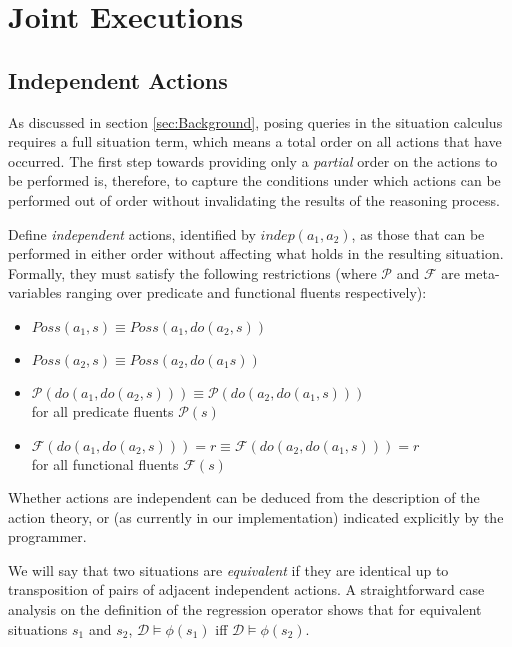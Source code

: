 \section{Joint Executions}

\label{sec:Joint-Execs}


\subsection{Independent Actions}

As discussed in section \ref{sec:Background}, posing queries in the
situation calculus requires a full situation term, which means a total
order on all actions that have occurred. The first step towards providing
only a \emph{partial} order on the actions to be performed is, therefore,
to capture the conditions under which actions can be performed out
of order without invalidating the results of the reasoning process.

Define \emph{independent} actions, identified by $indep(a_{1},a_{2})$,
as those that can be performed in either order without affecting what
holds in the resulting situation. Formally, they must satisfy the
following restrictions (where $\mathcal{P}$ and $\mathcal{F}$ are
meta-variables ranging over predicate and functional fluents respectively):

\begin{itemize}
\item $Poss(a_{1},s)\equiv Poss(a_{1},do(a_{2},s))$ 
\item $Poss(a_{2},s)\equiv Poss(a_{2},do(a_{1}s))$
\item $\mathcal{P}(do(a_{1},do(a_{2},s)))\equiv\mathcal{P}(do(a_{2},do(a_{1},s)))$\\
 for all predicate fluents $\mathcal{P}(s)$
\item $\mathcal{F}(do(a_{1},do(a_{2},s)))=r\equiv\mathcal{F}(do(a_{2},do(a_{1},s)))=r$\\
 for all functional fluents $\mathcal{F}(s)$
\end{itemize}
Whether actions are independent can be deduced from the description
of the action theory, or (as currently in our implementation) indicated
explicitly by the programmer.

We will say that two situations are \emph{equivalent} if they are
identical up to transposition of pairs of adjacent independent actions.
A straightforward case analysis on the definition of the regression
operator shows that for equivalent situations $s_{1}$ and $s_{2}$,
$\mathcal{D}\models\phi(s_{1})$ iff $\mathcal{D}\models\phi(s_{2})$.

